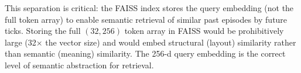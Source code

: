This separation is critical: the FAISS index stores the query embedding (not the full token array) to enable semantic retrieval of similar past episodes by future ticks. Storing the full $(32, 256)$ token array in FAISS would be prohibitively large (32× the vector size) and would embed structural (layout) similarity rather than semantic (meaning) similarity. The 256-d query embedding is the correct level of semantic abstraction for retrieval.
